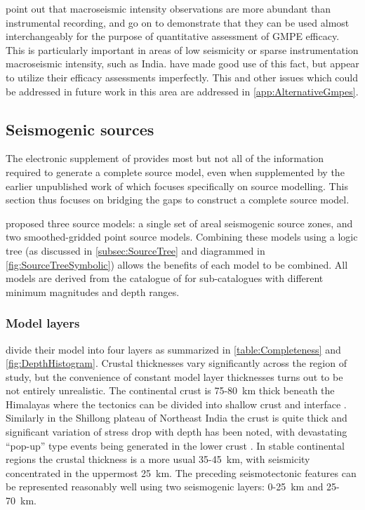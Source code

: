 \documentclass{article}
\begin{document}
\cite{delavaud2009information} point out that macroseismic intensity observations are more abundant than instrumental recording, and go on to demonstrate that they can be used almost interchangeably for the purpose of quantitative assessment of GMPE efficacy.
This is particularly important in areas of low seismicity or sparse instrumentation macroseismic intensity, such as India.
\cite{nath2011peak} have made good use of this fact, but \cite{nath2012probabilistic} appear to utilize their efficacy assessments imperfectly. 
This and other issues which could be addressed in future work in this area are addressed in \autoref{app:AlternativeGmpes}.

\subsection{Seismogenic sources}
\label{subsec:Sources}

The electronic supplement of \cite{nath2012probabilistic} provides most but not all of the information required to generate a complete source model, even when supplemented by the earlier unpublished work of \cite{thingbaijam2011seismogenic} which focuses specifically on source modelling.
This section thus focuses on bridging the gaps to construct a complete source model.

\cite{nath2012probabilistic} proposed three source models: a single set of areal seismogenic source zones, and two smoothed-gridded point source models.
Combining these models using a logic tree (as discussed in \autoref{subsec:SourceTree} and diagrammed in  \autoref{fig:SourceTreeSymbolic}) allows the benefits of each model to be combined.
All models are derived from the catalogue of \cite{nath2010earthquake} for sub-catalogues with different minimum magnitudes and depth ranges.

\subsubsection{Model layers}
\label{subsubsec:Layers}

\cite{thingbaijam2011seismogenic} divide their model into four layers as summarized in \autoref{table:Completeness} and \autoref{fig:DepthHistogram}.
Crustal thicknesses vary significantly across the region of study, but the convenience of constant model layer thicknesses turns out to be not entirely unrealistic.
The continental crust is 75-80~km thick beneath the Himalayas where the tectonics can be divided into shallow crust and interface \citep{thingbaijam2011seismogenic}.
Similarly in the Shillong plateau of Northeast India the crust is quite thick and significant variation of stress drop with depth has been noted, with devastating ``pop-up'' type events \citep{bilham2001plateau} being generated in the lower crust \citep{nath2012ground}.
In stable continental regions the crustal thickness is a more usual 35-45~km, with seismicity concentrated in the uppermost 25~km.
The preceding seismotectonic features can be represented reasonably well using two seismogenic layers: 0-25~km and 25-70~km.
\end{document}
